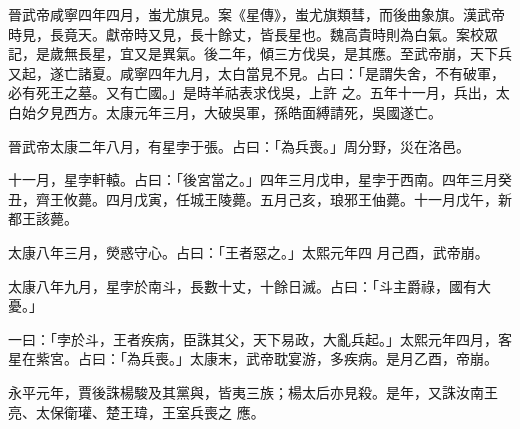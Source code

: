 \begin{pinyinscope}
 晉武帝咸寧四年四月，蚩尤旗見。案《星傳》，蚩尤旗類彗，而後曲象旗。漢武帝時見，長竟天。獻帝時又見，長十餘丈，皆長星也。魏高貴時則為白氣。案校眾記，是歲無長星，宜又是異氣。後二年，傾三方伐吳，是其應。至武帝崩，天下兵又起，遂亡諸夏。咸寧四年九月，太白當見不見。占曰：「是謂失舍，不有破軍，必有死王之墓。又有亡國。」是時羊祜表求伐吳，上許
 之。五年十一月，兵出，太白始夕見西方。太康元年三月，大破吳軍，孫皓面縛請死，吳國遂亡。



 晉武帝太康二年八月，有星孛于張。占曰：「為兵喪。」周分野，災在洛邑。



 十一月，星孛軒轅。占曰：「後宮當之。」四年三月戊申，星孛于西南。四年三月癸丑，齊王攸薨。四月戊寅，任城王陵薨。五月己亥，琅邪王伷薨。十一月戊午，新都王該薨。



 太康八年三月，熒惑守心。占曰：「王者惡之。」太熙元年四
 月己酉，武帝崩。



 太康八年九月，星孛於南斗，長數十丈，十餘日滅。占曰：「斗主爵祿，國有大憂。」



 一曰：「孛於斗，王者疾病，臣誅其父，天下易政，大亂兵起。」太熙元年四月，客星在紫宮。占曰：「為兵喪。」太康末，武帝耽宴游，多疾病。是月乙酉，帝崩。



 永平元年，賈後誅楊駿及其黨與，皆夷三族；楊太后亦見殺。是年，又誅汝南王亮、太保衛瓘、楚王瑋，王室兵喪之
 應。



\end{pinyinscope}